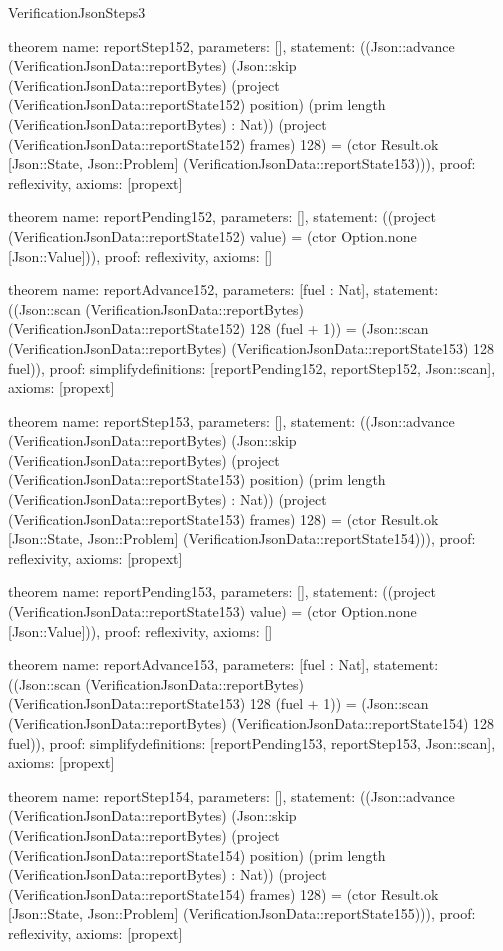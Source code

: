 \begin{lexlean}{VerificationJsonSteps3}
\begin{semanticmodule}
theorem{
  name: reportStep152,
  parameters: [],
  statement: ((Json::advance (VerificationJsonData::reportBytes) (Json::skip (VerificationJsonData::reportBytes) (project (VerificationJsonData::reportState152) position) (prim length (VerificationJsonData::reportBytes) : Nat)) (project (VerificationJsonData::reportState152) frames) 128) = (ctor Result.ok [Json::State, Json::Problem] (VerificationJsonData::reportState153))),
  proof: reflexivity{},
  axioms: [propext]
}

theorem{
  name: reportPending152,
  parameters: [],
  statement: ((project (VerificationJsonData::reportState152) value) = (ctor Option.none [Json::Value])),
  proof: reflexivity{},
  axioms: []
}

theorem{
  name: reportAdvance152,
  parameters: [fuel : Nat],
  statement: ((Json::scan (VerificationJsonData::reportBytes) (VerificationJsonData::reportState152) 128 (fuel + 1)) = (Json::scan (VerificationJsonData::reportBytes) (VerificationJsonData::reportState153) 128 fuel)),
  proof: simplify{definitions: [reportPending152, reportStep152, Json::scan]},
  axioms: [propext]
}

theorem{
  name: reportStep153,
  parameters: [],
  statement: ((Json::advance (VerificationJsonData::reportBytes) (Json::skip (VerificationJsonData::reportBytes) (project (VerificationJsonData::reportState153) position) (prim length (VerificationJsonData::reportBytes) : Nat)) (project (VerificationJsonData::reportState153) frames) 128) = (ctor Result.ok [Json::State, Json::Problem] (VerificationJsonData::reportState154))),
  proof: reflexivity{},
  axioms: [propext]
}

theorem{
  name: reportPending153,
  parameters: [],
  statement: ((project (VerificationJsonData::reportState153) value) = (ctor Option.none [Json::Value])),
  proof: reflexivity{},
  axioms: []
}

theorem{
  name: reportAdvance153,
  parameters: [fuel : Nat],
  statement: ((Json::scan (VerificationJsonData::reportBytes) (VerificationJsonData::reportState153) 128 (fuel + 1)) = (Json::scan (VerificationJsonData::reportBytes) (VerificationJsonData::reportState154) 128 fuel)),
  proof: simplify{definitions: [reportPending153, reportStep153, Json::scan]},
  axioms: [propext]
}

theorem{
  name: reportStep154,
  parameters: [],
  statement: ((Json::advance (VerificationJsonData::reportBytes) (Json::skip (VerificationJsonData::reportBytes) (project (VerificationJsonData::reportState154) position) (prim length (VerificationJsonData::reportBytes) : Nat)) (project (VerificationJsonData::reportState154) frames) 128) = (ctor Result.ok [Json::State, Json::Problem] (VerificationJsonData::reportState155))),
  proof: reflexivity{},
  axioms: [propext]
}


\end{semanticmodule}
\end{lexlean}
